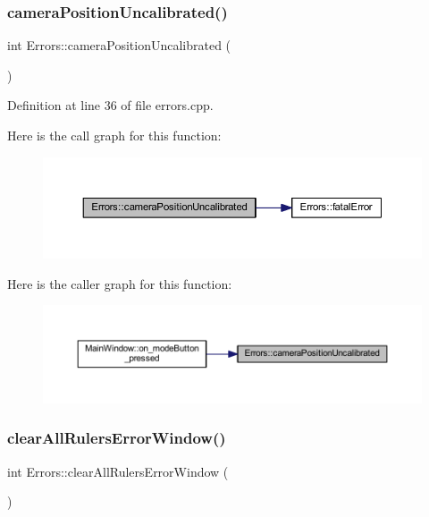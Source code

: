 \subsubsection{\texorpdfstring{cameraPositionUncalibrated()}{cameraPositionUncalibrated()}}
{\footnotesize\ttfamily int Errors\+::camera\+Position\+Uncalibrated (\begin{DoxyParamCaption}{ }\end{DoxyParamCaption})\hspace{0.3cm}{\ttfamily [static]}}



Definition at line 36 of file errors.\+cpp.

Here is the call graph for this function\+:\nopagebreak
\begin{figure}[H]
\begin{center}
\leavevmode
\includegraphics[width=350pt]{class_errors_a988959b35354c727ebe2fd884ee34bae_cgraph}
\end{center}
\end{figure}
Here is the caller graph for this function\+:
\nopagebreak
\begin{figure}[H]
\begin{center}
\leavevmode
\includegraphics[width=350pt]{class_errors_a988959b35354c727ebe2fd884ee34bae_icgraph}
\end{center}
\end{figure}
\mbox{\label{class_errors_a1aad6f02f491d241fafa37b86dbd0c1a}} 
\subsubsection{\texorpdfstring{clearAllRulersErrorWindow()}{clearAllRulersErrorWindow()}}
{\footnotesize\ttfamily int Errors\+::clear\+All\+Rulers\+Error\+Window (\begin{DoxyParamCaption}{ }\end{DoxyParamCaption})\hspace{0.3cm}{\ttfamily [static]}}



